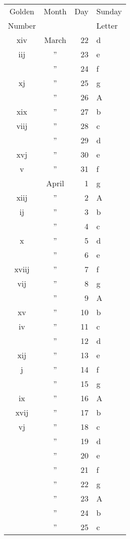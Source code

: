{\begin{multicols}{2}
\noindent\begin{tabular} { @{}c@{\hspace{.15cm}} c@{\hspace{.2cm}} r@{\hspace{.2cm}} l@{\hspace{.2cm}} }
Golden & Month & Day & Sunday \\
Number &    &   & Letter \\
\hline
xiv & March & 22 & d \\
iij & ” & 23 & e \\
    & ” & 24 & f \\
xj  & ” & 25 & g \\
    & ” & 26 & A \\
xix & ” & 27 & b \\
viij & ” & 28 & c \\
    & ” & 29 & d \\
xvj & ” & 30 & e \\
v   & ” & 31 & f \\
    & April & 1 & g \\
xiij & ” & 2 & A\\
ij & ” & 3 & b\\
  & ” & 4 & c \\
x &	”	&5&	d\\
&”	&6&	e\\
xviij	&”&	7&	f\\
vij	&”&	8&	g\\
&”	&9&	A\\
xv	&”&	10&	b\\
iv	&”&	11&	c\\
&”	&12&	d\\
xij	&”&	13&	e\\
j	&”&	14&	f\\
&”	&15&	g\\
ix	&”&	16&	A\\
xvij	&”&	17&	b\\
vj	&”&	18&	c\\
&”	&19&	d\\
&”	&20&	e\\
&”	&21&	f\\
&”	&22&	g\\
&”	&23&	A\\
&”	&24&	b\\
&”	&25&	c\\

\end{tabular}
\footnotesize
\vspace{6pt}


\end{multicols}}
